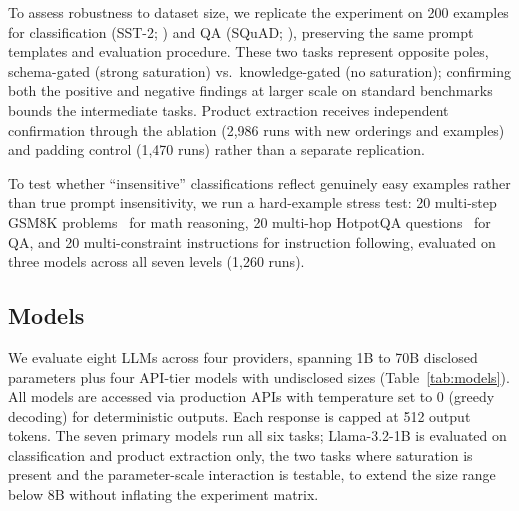 To assess robustness to dataset size, we replicate the experiment on
200 examples for classification (SST-2; \citealt{socher2013recursive})
and QA (SQuAD; \citealt{rajpurkar2016squad}), preserving the same prompt
templates and evaluation procedure.
These two tasks represent opposite poles, schema-gated (strong saturation)
vs.\ knowledge-gated (no saturation); confirming both the positive and
negative findings at larger scale on standard benchmarks bounds the
intermediate tasks.
Product extraction receives independent confirmation through the ablation
(2,986 runs with new orderings and examples) and padding control
(1,470 runs) rather than a separate replication.

To test whether ``insensitive'' classifications reflect genuinely easy
examples rather than true prompt insensitivity, we run a hard-example
stress test: 20 multi-step GSM8K problems~\citep{cobbe2021gsm8k} for
math reasoning, 20 multi-hop HotpotQA questions~\citep{yang2018hotpotqa}
for QA, and 20 multi-constraint instructions for instruction following,
evaluated on three models across all seven levels (1,260 runs).

\subsection{Models}
\label{sec:models}

We evaluate eight LLMs across four providers, spanning 1B to 70B disclosed
parameters plus four API-tier models with undisclosed sizes
(Table~\ref{tab:models}).
All models are accessed via production APIs with temperature set to 0
(greedy decoding) for deterministic outputs.
Each response is capped at 512 output tokens.
The seven primary models run all six tasks; Llama-3.2-1B is evaluated on
classification and product extraction only, the two tasks where saturation
is present and the parameter-scale interaction is testable, to extend the
size range below 8B without inflating the experiment matrix.

